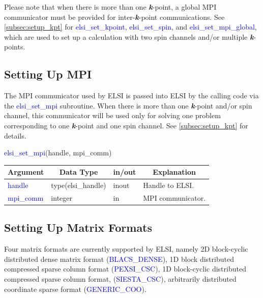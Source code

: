 \documentclass{report}
\begin{document}
Please note that when there is more than one \textbf{\textit{k}}-point, a global MPI communicator must be provided for inter-\textbf{\textit{k}}-point communications. See \ref{subsec:setup_kpt} for \textcolor{blue}{elsi\_set\_kpoint}, \textcolor{blue}{elsi\_set\_spin}, and \textcolor{blue}{elsi\_set\_mpi\_global}, which are used to set up a calculation with two spin channels and/or multiple \textbf{\textit{k}}-points.

\subsection{Setting Up MPI}
\label{subsec:setup_mpi}
The MPI communicator used by ELSI is passed into ELSI by the calling code via the \textcolor{blue}{elsi\_set\_mpi} subroutine. When there is more than one \textbf{\textit{k}}-point and/or spin channel, this communicator will be used only for solving one problem corresponding to one \textbf{\textit{k}}-point and one spin channel. See \ref{subsec:setup_kpt} for details.
\begin{labeling}{\hspace{6cm}}
\item [\hspace{0.3cm} \textcolor{blue}{elsi\_set\_mpi}(handle, mpi\_comm)]
\end{labeling}

\begin{tabular}[]{|p{30mm}|p{30mm}|p{15mm}|p{90mm}|}
\hline
\multicolumn{1}{|c|}{\textbf{Argument}} & \multicolumn{1}{c|}{\textbf{Data Type}} & \multicolumn{1}{c|}{\textbf{in/out}} & \multicolumn{1}{c|}{\textbf{Explanation}}\\
\hline
\textcolor{blue}{handle}    & type(elsi\_handle) & inout & Handle to ELSI.\\
\hline
\textcolor{blue}{mpi\_comm} & integer            & in    & MPI communicator.\\
\hline
\end{tabular}

\subsection{Setting Up Matrix Formats}
\label{subsec:setup_matrix}
Four matrix formats are currently supported by ELSI, namely 2D block-cyclic distributed dense matrix format (\textcolor{blue}{BLACS\_DENSE}), 1D block distributed compressed sparse column format (\textcolor{blue}{PEXSI\_CSC}), 1D block-cyclic distributed compressed sparse column format, (\textcolor{blue}{SIESTA\_CSC}), arbitrarily distributed coordinate sparse format (\textcolor{blue}{GENERIC\_COO}).
\end{document}
